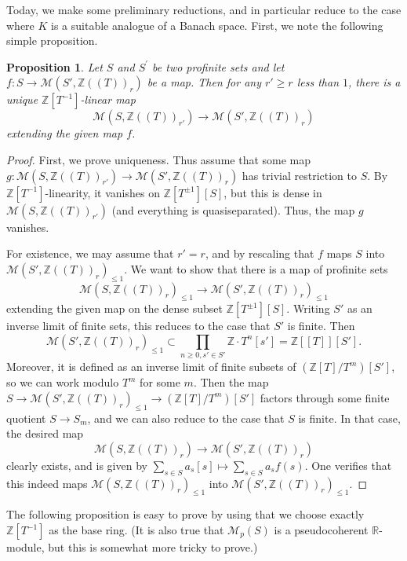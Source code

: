 \documentclass[11pt]{amsbook}
\numberwithin{equation}{section}
\numberwithin{theorem}{section}
\newtheorem{proposition}[theorem]{Proposition}
\theoremstyle{definition}
\begin{document}
Today, we make some preliminary reductions, and in particular reduce to the case where $K$ is a suitable analogue of a Banach space. First, we note the following simple proposition.

\begin{proposition}\label{prop:liquidabelianlevel} Let $S$ and $S^\prime$ be two profinite sets and let $f: S\to \mathcal M(S',\mathbb Z((T))_r)$ be a map. Then for any $r'\geq r$ less than $1$, there is a unique $\mathbb Z[T^{-1}]$-linear map
\[
\mathcal M(S,\mathbb Z((T))_{r'})\to \mathcal M(S',\mathbb Z((T))_r)
\]
extending the given map $f$.
\end{proposition}

\begin{proof} First, we prove uniqueness. Thus assume that some map $g: \mathcal M(S,\mathbb Z((T))_{r'})\to \mathcal M(S',\mathbb Z((T))_r)$ has trivial restriction to $S$. By $\mathbb Z[T^{-1}]$-linearity, it vanishes on $\mathbb Z[T^{\pm 1}][S]$, but this is dense in $\mathcal M(S,\mathbb Z((T))_{r'})$ (and everything is quasiseparated). Thus, the map $g$ vanishes.

For existence, we may assume that $r'=r$, and by rescaling that $f$ maps $S$ into $\mathcal M(S',\mathbb Z((T))_r)_{\leq 1}$. We want to show that there is a map of profinite sets
\[
\mathcal M(S,\mathbb Z((T))_r)_{\leq 1}\to \mathcal M(S',\mathbb Z((T))_r)_{\leq 1}
\]
extending the given map on the dense subset $\mathbb Z[T^{\pm 1}][S]$. Writing $S'$ as an inverse limit of finite sets, this reduces to the case that $S'$ is finite. Then
\[
\mathcal M(S',\mathbb Z((T))_r)_{\leq 1}\subset \prod_{n\geq 0,s'\in S'} \mathbb Z\cdot T^n [s'] = \mathbb Z[[T]][S'].
\]
Moreover, it is defined as an inverse limit of finite subsets of $(\mathbb Z[T]/T^m)[S']$, so we can work modulo $T^m$ for some $m$. Then the map $S\to \mathcal M(S',\mathbb Z((T))_r)_{\leq 1}\to (\mathbb Z[T]/T^m)[S']$ factors through some finite quotient $S\to S_m$, and we can also reduce to the case that $S$ is finite. In that case, the desired map
\[
\mathcal M(S,\mathbb Z((T))_r)\to \mathcal M(S',\mathbb Z((T))_r)
\]
clearly exists, and is given by $\sum_{s\in S} a_s [s]\mapsto \sum_{s\in S} a_s f(s)$. One verifies that this indeed maps $\mathcal M(S,\mathbb Z((T))_r)_{\leq 1}$ into $\mathcal M(S',\mathbb Z((T))_r)_{\leq 1}$.
\end{proof}

The following proposition is easy to prove by using that we choose exactly $\mathbb Z[T^{-1}]$ as the base ring. (It is also true that $\mathcal M_p(S)$ is a pseudocoherent $\mathbb R$-module, but this is somewhat more tricky to prove.)
\end{document}
